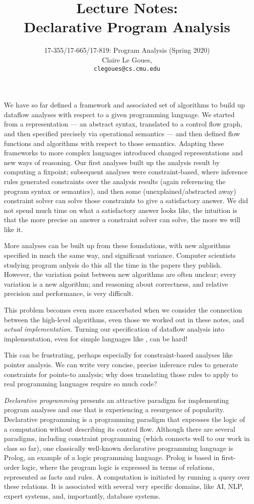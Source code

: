 \documentclass[11pt]{article}
\title{Lecture Notes: \\
		Declarative Program Analysis}
\author{17-355/17-665/17-819: Program Analysis (Spring 2020)\\
        Claire Le Goues, \\ {\tt clegoues@cs.cmu.edu}}
\date{}
\begin{document}
\maketitle

We have so far defined a framework and associated set of algorithms to build up
dataflow analyses with respect to a given programming language. We started from
a representation --- an abstract syntax, translated to a control flow graph, and
then specified precisely via operational semantics --- and then defined flow
functions and algorithms with respect to those semantics. Adapting these
frameworks to more complex languages introduced changed representations and new
ways of reasoning.  Our first analyses built up the analysis result by computing
a fixpoint; subsequent analyses were constraint-based, where inference
rules generated constraints over the analysis results (again referencing the
program syntax or semantics), and then some (unexplained/abstracted away)
constraint solver can solve those constraints to give a satisfactory answer.  We
did not spend much time on what a satisfactory answer looks like, the intuition
is that the more precise an answer a constraint solver can solve, the more we
will like it.

More analyses can be built up from these foundations, with new algorithms
specified in much the same way, and significant variance. Computer scientists
studying program anlysis do this all the time in the papers they publish.
However, the variation point between new algorithms are often unclear; every
variation is a new algorithm; and reasoning about correctness, and relative
precision and performance, is very difficult. 

This problem becomes even more exacerbated when we consider the connection
between the high-level algorithms, even those we worked out in these notes, and
\emph{actual implementation}.  Turning our specification of dataflow analysis
into implementation, even for simple languages like \WhileLang, can be hard! 

This can be frustrating, perhaps especially for constraint-based analyses like
pointer analysis.  We can write very concise, precise inference rules to
generate constraints for points-to analysis; why does translating those rules to
apply to real programming languages require so much code?

\emph{Declarative programming} presents an attractive paradigm for implementing
program analyses and one that is experiencing a resurgence of popularity.
Declarative programming is a programming paradigm that expresses the logic of a
computation without describing its control flow. Although there are several
paradigms, including constraint programming (which connects well to our work in
class so far), one classically well-known declarative programming language is
Prolog, an example of a logic programming language. Prolog is based in
first-order logic, where the program logic is expressed in terms of relations,
represented as facts and rules. A computation is initiated by running a query
over these relations.  It is associated with several very specific domains, like
AI, NLP, expert systems, and, importantly, database systems.
\end{document}
